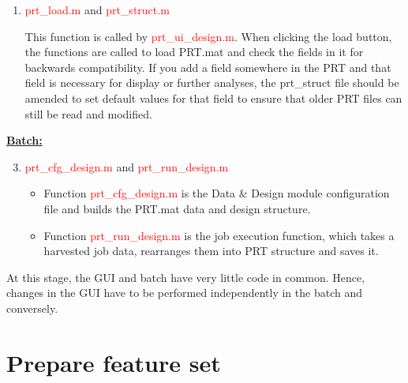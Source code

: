 \begin{enumerate}
\begin{itemize}
\item \textcolor{red}{prt\_data\_review.m} and \textcolor{red}{prt\_data\_review.fig}

The two functions define the GUI for reviewing the data.

\end{itemize}

\item \textcolor{red}{prt\_load.m} and \textcolor{red}{prt\_struct.m}

This function is called by \textcolor{red}{prt\_ui\_design.m}. When clicking the load button, the functions are called to load PRT.mat and check the fields in it for backwards compatibility. If you add a field somewhere in the PRT and that field is necessary for display or further analyses, the prt\_struct file should be amended to set default values for that field to ensure that older PRT files can still be read and modified.

\end{enumerate}

\noindent \textbf{\underline{Batch:}}

\begin{enumerate}
    \setcounter{enumi}{2}

\item \textcolor{red}{prt\_cfg\_design.m} and \textcolor{red}{prt\_run\_design.m}

\begin{itemize}
\item Function \textcolor{red}{prt\_cfg\_design.m} is the Data \& Design module configuration file and builds the PRT.mat data and design structure.
\item Function \textcolor{red}{prt\_run\_design.m} is the job execution function, which takes a harvested job data, rearranges them into PRT structure and saves it.
\end{itemize}

\end{enumerate}

At this stage, the GUI and batch have very little code in common. Hence, changes in the GUI have to be performed independently in the batch and conversely.  






\section{Prepare feature set}

